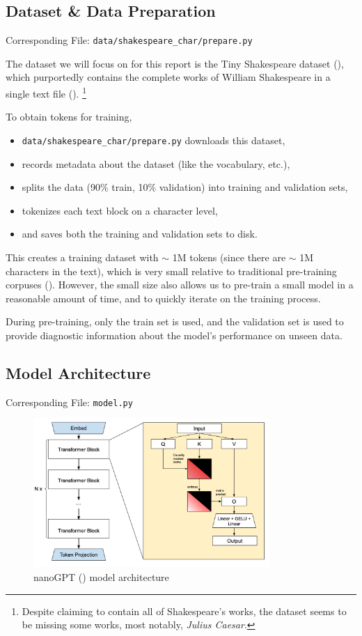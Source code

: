 \documentclass{article} %
\theoremstyle{definition}
\begin{document}
\subsection{Dataset \& Data Preparation}

Corresponding File: \texttt{data/shakespeare\_char/prepare.py}

The dataset we will focus on for this report is the Tiny Shakespeare dataset (\cite{tinyss}),
which purportedly contains the complete works of William Shakespeare in a single text file (\cite{tinyss2}).
\footnote{
    Despite claiming to contain all of Shakespeare's works, the dataset seems to be missing
    some works, most notably, \textit{Julius Caesar}.
}

To obtain tokens for training, 
\begin{itemize}
    \item \texttt{data/shakespeare\_char/prepare.py} downloads this dataset,
    \item records metadata about the dataset (like the vocabulary, etc.),
    \item splits the data (90\% train, 10\% validation) into training and validation sets,
    \item tokenizes each text block on a character level,
    \item and saves both the training and validation sets to disk.
\end{itemize}

This creates a training dataset with $\sim$ 1M tokens (since there are $\sim$ 1M characters in the text),
which is very small relative to traditional pre-training corpuses (\cite{beh-2025}).
However, the small size also allows us to pre-train a small model in a reasonable amount of time,
and to quickly iterate on the training process.

During pre-training, only the train set is used, and the validation set is used
to provide diagnostic information about the model's performance on unseen data.

\subsection{Model Architecture}
Corresponding File: \texttt{model.py}

\begin{figure}[h]
    \centering
    \includegraphics[width=0.8\textwidth]{images/gpt_arch.png}
    \caption{nanoGPT (\cite{nanoGPT}) model architecture}
    \label{fig:nanogpt_architecture}
\end{figure}
\end{document}
